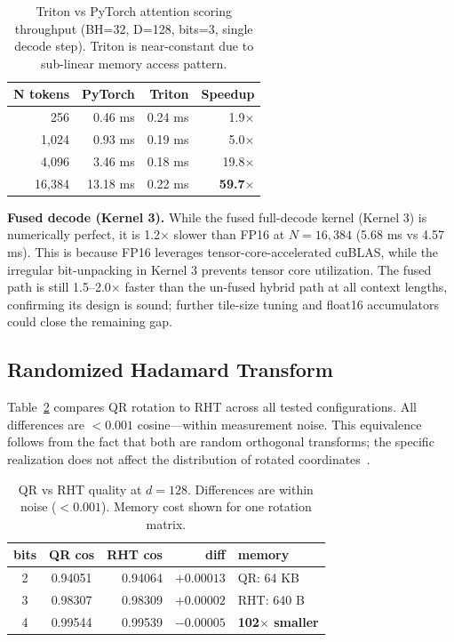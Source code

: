 \documentclass[10pt,twocolumn]{article}
\begin{document}
\begin{table}[ht]
\centering
\caption{Triton vs PyTorch attention scoring throughput (BH=32, D=128, bits=3, single decode step). Triton is near-constant due to sub-linear memory access pattern.}
\label{tab:speedup}
\begin{tabular}{rrrr}
\toprule
\textbf{N tokens} & \textbf{PyTorch} & \textbf{Triton} & \textbf{Speedup} \\
\midrule
256    & 0.46 ms & 0.24 ms & 1.9$\times$  \\
1,024  & 0.93 ms & 0.19 ms & 5.0$\times$  \\
4,096  & 3.46 ms & 0.18 ms & 19.8$\times$ \\
16,384 & 13.18 ms & 0.22 ms & \textbf{59.7}$\times$ \\
\bottomrule
\end{tabular}
\end{table}

\textbf{Fused decode (Kernel 3).} While the fused full-decode kernel (Kernel 3) is numerically perfect, it is 1.2$\times$ slower than FP16 at $N = 16{,}384$ (5.68 ms vs 4.57 ms). This is because FP16 leverages tensor-core-accelerated cuBLAS, while the irregular bit-unpacking in Kernel 3 prevents tensor core utilization. The fused path is still 1.5--2.0$\times$ faster than the un-fused hybrid path at all context lengths, confirming its design is sound; further tile-size tuning and float16 accumulators could close the remaining gap.

\subsection{Randomized Hadamard Transform}
\label{sec:rht}

Table~\ref{tab:rht} compares QR rotation to RHT across all tested configurations. All differences are $< 0.001$ cosine—within measurement noise. This equivalence follows from the fact that both are random orthogonal transforms; the specific realization does not affect the distribution of rotated coordinates~\cite{ailon2009fast}.

\begin{table}[ht]
\centering
\caption{QR vs RHT quality at $d=128$. Differences are within noise ($< 0.001$). Memory cost shown for one rotation matrix.}
\label{tab:rht}
\begin{tabular}{ccrrl}
\toprule
\textbf{bits} & \textbf{QR cos} & \textbf{RHT cos} & \textbf{diff} & \textbf{memory} \\
\midrule
2 & 0.94051 & 0.94064 & $+0.00013$ & QR: 64 KB \\
3 & 0.98307 & 0.98309 & $+0.00002$ & RHT: 640 B \\
4 & 0.99544 & 0.99539 & $-0.00005$ & \textbf{102$\times$ smaller} \\
\bottomrule
\end{tabular}
\end{table}
\end{document}
